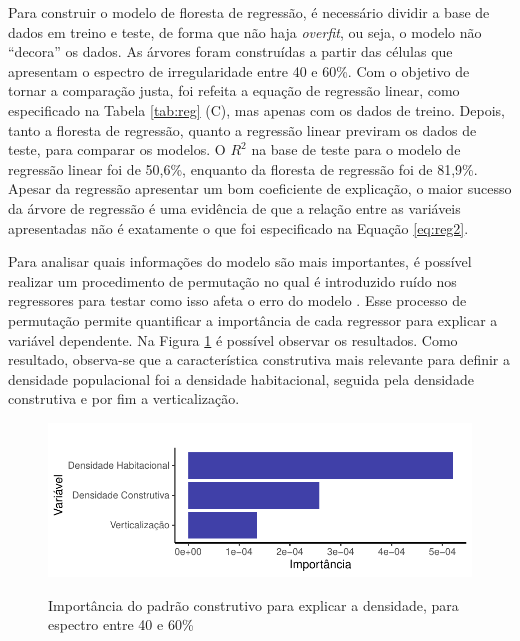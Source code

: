 Para construir o modelo de floresta de regressão, é necessário dividir a base de dados em treino e teste, de forma que não haja \textit{overfit}, ou seja, o modelo não ``decora'' os dados. As árvores foram construídas a partir das células que apresentam o espectro de irregularidade entre 40 e 60\%. Com o objetivo de tornar a comparação justa, foi refeita a equação de regressão linear, como especificado na Tabela \ref{tab:reg} (C), mas apenas com os dados de treino. Depois, tanto a floresta de regressão, quanto a regressão linear previram os dados de teste, para comparar os modelos. O $R^2$ na base de teste para o modelo de regressão linear foi de 50,6\%, enquanto da floresta de regressão foi de 81,9\%. Apesar da regressão apresentar um bom coeficiente de explicação, o maior sucesso da árvore de regressão é uma evidência de que a relação entre as variáveis apresentadas não é exatamente o que foi especificado na Equação \ref{eq:reg2}.

Para analisar quais informações do modelo são mais importantes, é possível realizar um procedimento de permutação no qual é introduzido ruído nos regressores para testar como isso afeta o erro do modelo \cite{breiman2001random, Nembrini2018}. Esse processo de permutação permite quantificar a importância de cada regressor para explicar a variável dependente. Na Figura \ref{fig:importancia-restrito} é possível observar os resultados. Como resultado, observa-se que a característica construtiva mais relevante para definir a densidade populacional foi a densidade habitacional, seguida pela densidade construtiva e por fim a verticalização.

\begin{figure}[h]
    \centering
    \caption{Importância do padrão construtivo para explicar a densidade, para espectro entre 40 e 60\%}
    \includegraphics[width = .8\linewidth]{imagens/var_importance_restrito.pdf}
    \label{fig:importancia-restrito}
\end{figure}

